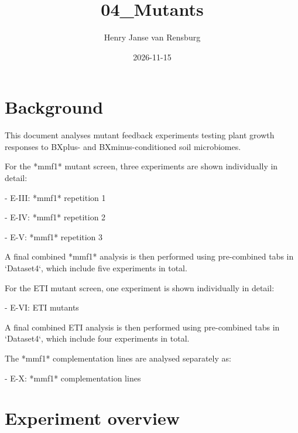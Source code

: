 \documentclass[
  10pt,
]{article}
\title{04\_Mutants}
\author{Henry Janse van Rensburg}
\date{2026-11-15}
\renewcommand*\contentsname{Table of contents}
\newcommand\contentsname{Table of contents}
\begin{document}
\maketitle

\renewcommand*\contentsname{Table of contents}
{
\hypersetup{linkcolor=}
\setcounter{tocdepth}{2}
\tableofcontents
}

\section{Background}\label{background}

This document analyses mutant feedback experiments testing plant growth
responses to BXplus- and BXminus-conditioned soil microbiomes.

For the *mmf1* mutant screen, three experiments are shown individually
in detail:

- E-III: *mmf1* repetition 1

- E-IV: *mmf1* repetition 2

- E-V: *mmf1* repetition 3

A final combined *mmf1* analysis is then performed using pre-combined
tabs in `Dataset4`, which include five experiments in total.

For the ETI mutant screen, one experiment is shown individually in
detail:

- E-VI: ETI mutants

A final combined ETI analysis is then performed using pre-combined tabs
in `Dataset4`, which include four experiments in total.

The *mmf1* complementation lines are analysed separately as:

- E-X: *mmf1* complementation lines

\section{Experiment overview}\label{experiment-overview}
\end{document}
